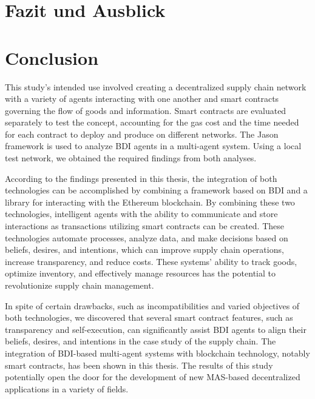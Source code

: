 {\chapter{Fazit und Ausblick}}
{\chapter{Conclusion}}

\label{sec:conclusion}
This study's intended use involved creating a decentralized supply chain network with a variety of agents interacting with one another and smart contracts governing the flow of goods and information. Smart contracts are evaluated separately to test the concept, accounting for the gas cost and the time needed for each contract to deploy and produce on different networks. The Jason framework is used to analyze \ac{BDI} agents in a multi-agent system. Using a local test network, we obtained the required findings from both analyses.
\vspace{.5cm}

According to the findings presented in this thesis, the integration of both technologies can be accomplished by combining a framework based on \ac{BDI} and a library for interacting with the Ethereum blockchain. By combining these two technologies, intelligent agents with the ability to communicate and store interactions as transactions utilizing smart contracts can be created. These technologies automate processes, analyze data, and make decisions based on beliefs, desires, and intentions, which can improve supply chain operations, increase transparency, and reduce costs. These systems' ability to track goods, optimize inventory, and effectively manage resources has the potential to revolutionize supply chain management.

\vspace{.5cm}

In spite of certain drawbacks, such as incompatibilities and varied objectives of both technologies, we discovered that several smart contract features, such as transparency and self-execution, can significantly assist \ac{BDI} agents to align their beliefs, desires, and intentions in the case study of the supply chain. The integration of \ac{BDI}-based multi-agent systems with blockchain technology, notably smart contracts, has been shown in this thesis. The results of this study potentially open the door for the development of new \ac{MAS}-based decentralized applications in a variety of fields.


